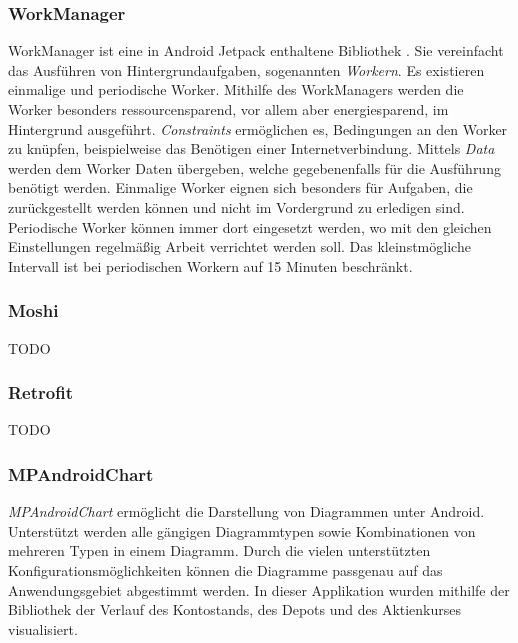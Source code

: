 \documentclass[a4paper]{article}
\begin{document}
\subsubsection{WorkManager}
\label{subsubsec:technologies:bibs:workmanager}
WorkManager ist eine in Android Jetpack enthaltene Bibliothek \autocite{android_workmanager}. Sie vereinfacht das Ausführen von Hintergrundaufgaben, sogenannten \textit{Workern}. Es existieren einmalige und periodische Worker. Mithilfe des WorkManagers werden die Worker besonders ressourcensparend, vor allem aber energiesparend, im Hintergrund ausgeführt. \textit{Constraints} ermöglichen es, Bedingungen an den Worker zu knüpfen, beispielweise das Benötigen einer Internetverbindung. Mittels \textit{Data} werden dem Worker Daten übergeben, welche gegebenenfalls für die Ausführung benötigt werden. Einmalige Worker eignen sich besonders für Aufgaben, die zurückgestellt werden können und nicht im Vordergrund zu erledigen sind. Periodische Worker können immer dort eingesetzt werden, wo mit den gleichen Einstellungen regelmäßig Arbeit verrichtet werden soll. Das kleinstmögliche Intervall ist bei periodischen Workern auf 15 Minuten beschränkt.


\subsubsection{Moshi}
\label{subsubsec:technologies:bibs:moshi}
TODO


\subsubsection{Retrofit}
\label{subsubsec:technologies:bibs:retrofit}
TODO


\subsubsection{MPAndroidChart}
\label{subsubsec:technologies:bibs:mpandroidchart}
\textit{MPAndroidChart} \autocite{mpandroidchart} ermöglicht die Darstellung von Diagrammen unter Android. Unterstützt werden alle gängigen Diagrammtypen sowie Kombinationen von mehreren Typen in einem Diagramm. Durch die vielen unterstützten Konfigurationsmöglichkeiten können die Diagramme passgenau auf das Anwendungsgebiet abgestimmt werden. In dieser Applikation wurden mithilfe der Bibliothek der Verlauf des Kontostands, des Depots und des Aktienkurses visualisiert.
\end{document}
